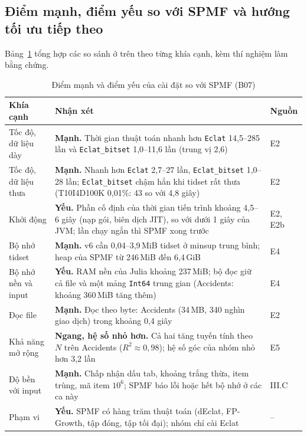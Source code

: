 \subsection{Điểm mạnh, điểm yếu so với SPMF và hướng tối ưu tiếp theo}
\label{sec:manh-yeu}

Bảng~\ref{tab:b07} tổng hợp các so sánh ở trên theo từng khía cạnh, kèm thí nghiệm làm bằng chứng.

\begin{table}[t]
\caption{Điểm mạnh và điểm yếu của cài đặt so với SPMF (B07)}
\label{tab:b07}
\centering
\footnotesize
\setlength{\tabcolsep}{3pt}
\begin{tabular}{@{}p{1.55cm}p{5.25cm}l@{}}
\toprule
Khía cạnh & Nhận xét & Nguồn \\
\midrule
Tốc độ, dữ liệu dày & \textbf{Mạnh.} Thời gian thuật toán nhanh hơn \texttt{Eclat} 14,5--285 lần và \texttt{Eclat\_bitset} 1,0--11,6 lần (trung vị 2,6) & E2 \\
Tốc độ, dữ liệu thưa & \textbf{Mạnh.} Nhanh hơn \texttt{Eclat} 2,7--27 lần, \texttt{Eclat\_bitset} 1,0--28 lần; \texttt{Eclat\_bitset} chậm hẳn khi tidset rất thưa (T10I4D100K 0,01\%: 43 so với 4,8 giây) & E2 \\
Khởi động & \textbf{Yếu.} Phần cố định của thời gian tiến trình khoảng 4,5--6 giây (nạp gói, biên dịch JIT), so với dưới 1 giây của JVM; lần chạy ngắn thì SPMF xong trước & E2, E2b \\
Bộ nhớ tidset & \textbf{Mạnh.} v6 cần 0,04--3,9\,MiB tidset ở minsup trung bình; heap của SPMF từ 246\,MiB đến 6,4\,GiB & E4 \\
Bộ nhớ nền và input & \textbf{Yếu.} RAM nền của Julia khoảng 237\,MiB; bộ đọc giữ cả file và một mảng \texttt{Int64} trung gian (Accidents: khoảng 360\,MiB tăng thêm) & E4 \\
Đọc file & \textbf{Mạnh.} Đọc theo byte: Accidents (34\,MB, 340 nghìn giao dịch) trong khoảng 0,4 giây & E2 \\
Khả năng mở rộng & \textbf{Ngang, hệ số nhỏ hơn.} Cả hai tăng tuyến tính theo $N$ trên Accidents ($R^2 \approx 0{,}98$); hệ số góc của nhóm nhỏ hơn 3,2 lần & E5 \\
Độ bền với input & \textbf{Mạnh.} Chấp nhận dấu tab, khoảng trắng thừa, item trùng, mã item $10^6$; SPMF báo lỗi hoặc hết bộ nhớ ở các ca này & III.C \\
Phạm vi & \textbf{Yếu.} SPMF có hàng trăm thuật toán (dEclat, FP-Growth, tập đóng, tập tối đại); nhóm chỉ cài Eclat & -- \\
\bottomrule
\end{tabular}
\end{table}

